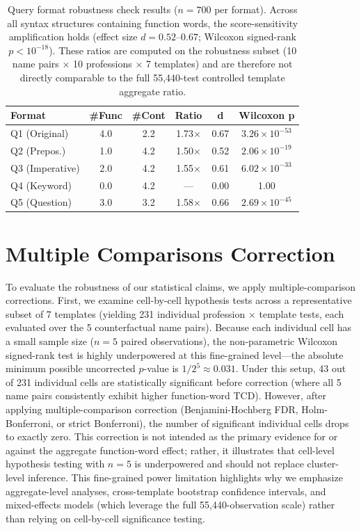 \documentclass[11pt]{article}
\begin{document}
\begin{table}[t]
\centering
\scriptsize
\setlength{\tabcolsep}{2.5pt}
\begin{tabular}{@{}lccccc@{}}
\toprule
\textbf{Format} & \textbf{\#Func} & \textbf{\#Cont} & \textbf{Ratio} & \textbf{d} & \textbf{Wilcoxon p} \\
\midrule
Q1 (Original)    & 4.0 & 2.2 & 1.73$\times$ & 0.67 & $3.26 \times 10^{-53}$ \\
Q2 (Prepos.)     & 1.0 & 4.2 & 1.50$\times$ & 0.52 & $2.06 \times 10^{-19}$ \\
Q3 (Imperative)  & 2.0 & 4.2 & 1.55$\times$ & 0.61 & $6.02 \times 10^{-33}$ \\
Q4 (Keyword)     & 0.0 & 4.2 & ---          & 0.00 & 1.00 \\
Q5 (Question)    & 3.0 & 3.2 & 1.58$\times$ & 0.66 & $2.69 \times 10^{-45}$ \\
\bottomrule
\end{tabular}
\caption{Query format robustness check results ($n=700$ per format). Across all syntax structures containing function words, the score-sensitivity amplification holds (effect size $d = 0.52$--$0.67$; Wilcoxon signed-rank $p < 10^{-18}$). These ratios are computed on the robustness subset (10 name pairs $\times$ 10 professions $\times$ 7 templates) and are therefore not directly comparable to the full 55{,}440-test controlled template aggregate ratio.}
\label{tab:query_format_results}
\end{table}

\section{Multiple Comparisons Correction}
\label{app:multiple_comparisons}

To evaluate the robustness of our statistical claims, we apply multiple-comparison corrections. First, we examine cell-by-cell hypothesis tests across a representative subset of 7 templates (yielding 231 individual profession $\times$ template tests, each evaluated over the 5 counterfactual name pairs). Because each individual cell has a small sample size ($n=5$ paired observations), the non-parametric Wilcoxon signed-rank test is highly underpowered at this fine-grained level---the absolute minimum possible uncorrected $p$-value is $1/2^5 \approx 0.031$. Under this setup, 43 out of 231 individual cells are statistically significant before correction (where all 5 name pairs consistently exhibit higher function-word TCD). However, after applying multiple-comparison correction (Benjamini-Hochberg FDR, Holm-Bonferroni, or strict Bonferroni), the number of significant individual cells drops to exactly zero. This correction is not intended as the primary evidence for or against the aggregate function-word effect; rather, it illustrates that cell-level hypothesis testing with $n=5$ is underpowered and should not replace cluster-level inference. This fine-grained power limitation highlights why we emphasize aggregate-level analyses, cross-template bootstrap confidence intervals, and mixed-effects models (which leverage the full 55{,}440-observation scale) rather than relying on cell-by-cell significance testing.
\end{document}
